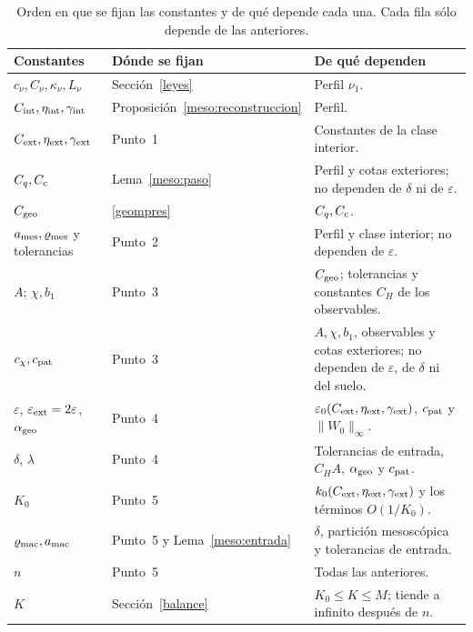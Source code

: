 \begin{table}[htbp]
\centering\small
\caption{Orden en que se fijan las constantes y de qué depende cada una. Cada fila sólo depende de
las anteriores.}
\label{tab:constantes}
\begin{tabular}{@{}p{.25\linewidth}p{.22\linewidth}>{\raggedright\arraybackslash}p{.45\linewidth}@{}}
\toprule
Constantes & Dónde se fijan & De qué dependen \\
\midrule
$c_\nu,C_\nu,\kappa_\nu,L_\nu$ & Sección~\ref{leyes} & Perfil $\nu_1$. \\
$C_{\rm int},\eta_{\rm int},\gamma_{\rm int}$ & Proposición~\ref{meso:reconstruccion} & Perfil. \\
$C_{\rm ext},\eta_{\rm ext},\gamma_{\rm ext}$ & Punto~1 & Constantes de la clase interior. \\
$C_q,C_{\rm c}$ & Lema~\ref{meso:paso} & Perfil y cotas exteriores; no dependen de $\delta$ ni de
$\varepsilon$. \\
$C_{\rm geo}$ & \eqref{geompres} & $C_q,C_{\rm c}$. \\
\addlinespace[.22em]
$a_{\rm mes},\varrho_{\rm mes}$ y tolerancias & Punto~2 & Perfil y clase interior; no dependen de
$\varepsilon$. \\
$A$; $\chi,b_1$ & Punto~3 & $C_{\rm geo}$; tolerancias y constantes $C_H$ de los observables. \\
$c_\chi,c_{\rm pat}$ & Punto~3 & $A,\chi,b_1$, observables y cotas exteriores; no dependen de
$\varepsilon$, de $\delta$ ni del suelo. \\
\addlinespace[.22em]
$\varepsilon$, $\varepsilon_{\rm ext}=2\varepsilon$, $\alpha_{\rm geo}$ & Punto~4 &
$\varepsilon_0(C_{\rm ext},\eta_{\rm ext},\gamma_{\rm ext})$, $c_{\rm pat}$ y $\|W_0\|_\infty$. \\
$\delta$, $\lambda$ & Punto~4 & Tolerancias de entrada, $C_HA$, $\alpha_{\rm geo}$ y $c_{\rm pat}$. \\
$K_0$ & Punto~5 & $k_0(C_{\rm ext},\eta_{\rm ext},\gamma_{\rm ext})$ y los términos $O(1/K_0)$. \\
$\varrho_{\rm mac},a_{\rm mac}$ & Punto~5 y Lema~\ref{meso:entrada} & $\delta$, partición
mesoscópica y tolerancias de entrada. \\
$n$ & Punto~5 & Todas las anteriores. \\
$K$ & Sección~\ref{balance} & $K_0\le K\le M$; tiende a infinito después de $n$. \\
\bottomrule
\end{tabular}
\end{table}
